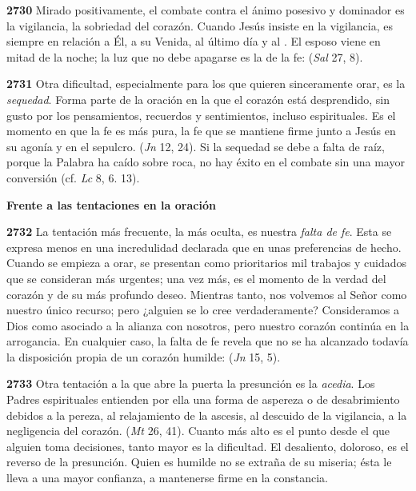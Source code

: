 \begin{body}
\textbf{2730} Mirado positivamente, el combate contra el ánimo posesivo y dominador es la vigilancia, la sobriedad del corazón. Cuando Jesús insiste en la vigilancia, es siempre en relación a Él, a su Venida, al último día y al . El esposo viene en mitad de la noche; la luz que no debe apagarse es la de la fe:  (\emph{Sal} 27, 8).

\textbf{2731} Otra dificultad, especialmente para los que quieren sinceramente orar, es la \emph{sequedad}. Forma parte de la oración en la que el corazón está desprendido, sin gusto por los pensamientos, recuerdos y sentimientos, incluso espirituales. Es el momento en que la fe es más pura, la fe que se mantiene firme junto a Jesús en su agonía y en el sepulcro.  (\emph{Jn} 12, 24). Si la sequedad se debe a falta de raíz, porque la Palabra ha caído sobre roca, no hay éxito en el combate sin una mayor conversión (cf. \emph{Lc} 8, 6. 13).



\textbf{Frente a las tentaciones en la oración}

\textbf{2732} La tentación más frecuente, la más oculta, es nuestra \emph{falta de fe}. Esta se expresa menos en una incredulidad declarada que en unas preferencias de hecho. Cuando se empieza a orar, se presentan como prioritarios mil trabajos y cuidados que se consideran más urgentes; una vez más, es el momento de la verdad del corazón y de su más profundo deseo. Mientras tanto, nos volvemos al Señor como nuestro único recurso; pero ¿alguien se lo cree verdaderamente? Consideramos a Dios como asociado a la alianza con nosotros, pero nuestro corazón continúa en la arrogancia. En cualquier caso, la falta de fe revela que no se ha alcanzado todavía la disposición propia de un corazón humilde:  (\emph{Jn} 15, 5).

\textbf{2733} Otra tentación a la que abre la puerta la presunción es la \emph{acedia}. Los Padres espirituales entienden por ella una forma de aspereza o de desabrimiento debidos a la pereza, al relajamiento de la ascesis, al descuido de la vigilancia, a la negligencia del corazón.  (\emph{Mt} 26, 41). Cuanto más alto es el punto desde el que alguien toma decisiones, tanto mayor es la dificultad. El desaliento, doloroso, es el reverso de la presunción. Quien es humilde no se extraña de su miseria; ésta le lleva a una mayor confianza, a mantenerse firme en la constancia.


\end{body}
